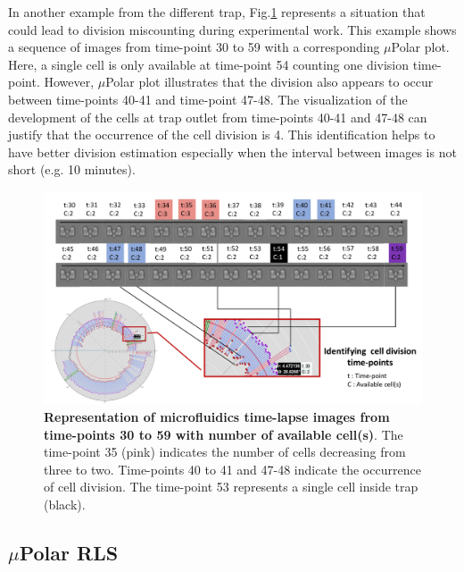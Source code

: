 \documentclass[conference]{IEEEtran}
\begin{document}
In another example from the different trap, Fig.\ref{fig:division} represents a situation that could lead to division miscounting during experimental work. This example shows a sequence of images from time-point 30 to 59 with a corresponding $\mu$Polar plot. Here, a single cell is only available at time-point 54 counting one division time-point. However, $\mu$Polar plot illustrates that the division also appears to occur between time-points 40-41 and time-point 47-48. The visualization of the development of the cells at trap outlet from time-points 40-41 and 47-48 can justify that the occurrence of the cell division is 4. This identification helps to have better division estimation especially when the interval between images is not short (e.g. 10 minutes). 

\begin{figure}
\centering
\includegraphics[width=\textwidth,height=10 cm]{Patterns/division.pdf}
\caption{ \textbf{ Representation of microfluidics time-lapse images from time-points 30 to 59 with number of available cell(s)}. The time-point 35 (pink) indicates the number of cells decreasing from three to two. Time-points 40 to 41 and 47-48 indicate the occurrence of cell division. The time-point 53 represents a single cell inside trap (black).}
\label{fig:division}
\end{figure}



\subsection{$\mu$Polar RLS}
\end{document}
